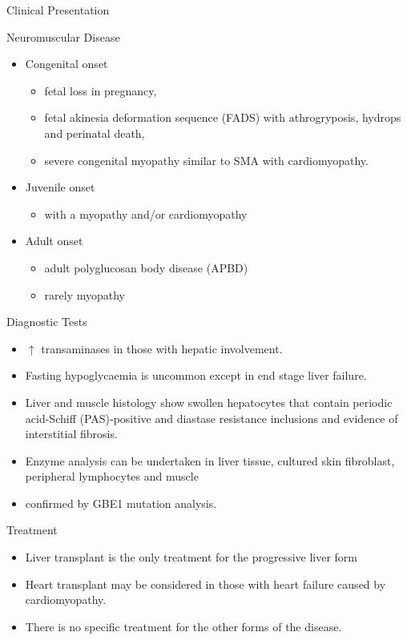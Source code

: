 \documentclass[presentation, smaller]{beamer}
\begin{document}
\begin{frame}[label={sec:org72d5734}]{Clinical Presentation}
\begin{block}{Neuromuscular Disease}
\begin{itemize}
\item Congenital onset
\begin{itemize}
\item fetal loss in pregnancy,
\item fetal akinesia deformation sequence (FADS) with athrogryposis, hydrops and perinatal death,
\item severe congenital myopathy similar to SMA with \textpm{}  cardiomyopathy.
\end{itemize}
\item Juvenile onset
\begin{itemize}
\item with a myopathy and/or cardiomyopathy
\end{itemize}
\item Adult onset
\begin{itemize}
\item adult polyglucosan body disease (APBD)
\item rarely myopathy
\end{itemize}
\end{itemize}
\end{block}
\end{frame}

\begin{frame}[label={sec:org771729f}]{Diagnostic Tests}
\begin{itemize}
\item \(\uparrow\) transaminases in those with hepatic involvement.
\item Fasting hypoglycaemia is uncommon except in end stage liver failure.
\item Liver and muscle histology show swollen hepatocytes that contain
periodic acid-Schiff (PAS)-positive and diastase resistance
inclusions and evidence of interstitial fibrosis.
\item Enzyme analysis can be undertaken in liver tissue, cultured skin
fibroblast, peripheral lymphocytes and muscle
\item confirmed by GBE1 mutation analysis.
\end{itemize}
\end{frame}

\begin{frame}[label={sec:org309d3cf}]{Treatment}
\begin{itemize}
\item Liver transplant is the only treatment for the progressive liver form
\item Heart transplant may be considered in those with heart failure caused by cardiomyopathy.
\item There is no specific treatment for the other forms of the disease.
\end{itemize}
\end{frame}
\end{document}
